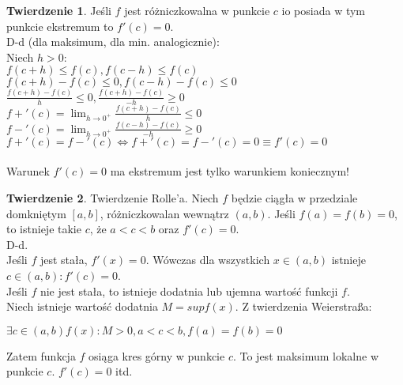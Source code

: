\documentclass{article}
\theoremstyle{definition}
\theoremstyle{definition}
\newtheorem{tw}{Twierdzenie}[subsection]
\theoremstyle{definition}
\theoremstyle{definition}
\begin{document}
\begin{tw}
Jeśli $f$ jest różniczkowalna w punkcie $c$ io posiada w tym punkcie ekstremum to $f'(c)=0$.\\
D-d (dla maksimum, dla min. analogicznie):\\
Niech $h>0$:\\
$f(c+h)\leq f(c), f(c-h)\leq f(c)$\\
$f(c+h)-f(c)\leq 0, f(c-h) - f(c) \leq 0$\\
$\frac{f(c+h)-f(c)}{h}\leq 0, \frac{f(c+h)-f(c)}{-h}\geq 0$\\
$f+'(c)=\lim_{h\rightarrow 0^+} \frac{f(c+h)-f(c)}{h}\leq 0$\\
$f-'(c)=\lim_{h\rightarrow 0^+} \frac{f(c-h)-f(c)}{-h}\geq 0$\\
$f+'(c)=f-'(c)\iff f+'(c)=f-'(c)=0 \equiv f'(c)=0$\\\\
Warunek $f'(c)=0$ ma ekstremum jest tylko warunkiem koniecznym!
\end{tw}

\begin{tw}
    Twierdzenie Rolle'a. Niech $f$ będzie ciągła w przedziale domkniętym $[a,b]$, różniczkowalan wewnątrz $(a,b)$. Jeśli $f(a)=f(b)=0$, to istnieje takie $c$, że $a<c<b$ oraz $f'(c)=0$.\\
    D-d.\\
    Jeśli $f$ jest stała, $f'(x)=0$. Wówczas dla wszystkich $x\in(a,b)$ istnieje $c\in(a,b) : f'(c)=0$.\\
    Jeśli $f$ nie jest stała, to istnieje dodatnia lub ujemna wartość funkcji $f$.\\
    Niech istnieje wartość dodatnia $M=sup f(x)$. Z twierdzenia Weierstraßa:
    \begin{center}
        $\exists c\in(a,b) f(x) : M>0, a<c<b, f(a)=f(b)=0$
    \end{center}
    Zatem funkcja $f$ osiąga kres górny w punkcie $c$. To jest maksimum lokalne w punkcie $c$. $f'(c)=0$ itd.
\end{tw}
\end{document}
